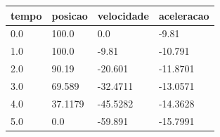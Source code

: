 \begin{tabular}{llll}
\toprule
tempo & posicao & velocidade & aceleracao \\
\midrule
0.0 & 100.0 & 0.0 & -9.81 \\
1.0 & 100.0 & -9.81 & -10.791 \\
2.0 & 90.19 & -20.601 & -11.8701 \\
3.0 & 69.589 & -32.4711 & -13.0571 \\
4.0 & 37.1179 & -45.5282 & -14.3628 \\
5.0 & 0.0 & -59.891 & -15.7991 \\
\bottomrule
\end{tabular}
